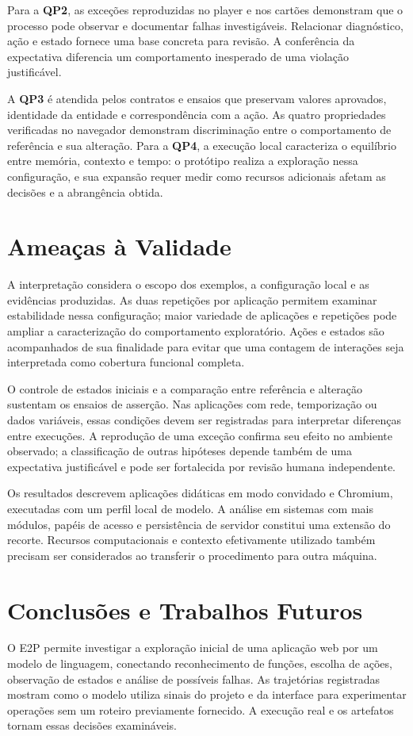 \documentclass[12pt]{article}
\begin{document}
Para a \textbf{QP2}, as exceções reproduzidas no player e nos cartões demonstram que o processo pode observar e documentar falhas investigáveis. Relacionar diagnóstico, ação e estado fornece uma base concreta para revisão. A conferência da expectativa diferencia um comportamento inesperado de uma violação justificável.

A \textbf{QP3} é atendida pelos contratos e ensaios que preservam valores aprovados, identidade da entidade e correspondência com a ação. As quatro propriedades verificadas no navegador demonstram discriminação entre o comportamento de referência e sua alteração. Para a \textbf{QP4}, a execução local caracteriza o equilíbrio entre memória, contexto e tempo: o protótipo realiza a exploração nessa configuração, e sua expansão requer medir como recursos adicionais afetam as decisões e a abrangência obtida.


\section{Ameaças à Validade}\label{sec:threats}
A interpretação considera o escopo dos exemplos, a configuração local e as evidências produzidas. As duas repetições por aplicação permitem examinar estabilidade nessa configuração; maior variedade de aplicações e repetições pode ampliar a caracterização do comportamento exploratório. Ações e estados são acompanhados de sua finalidade para evitar que uma contagem de interações seja interpretada como cobertura funcional completa.

O controle de estados iniciais e a comparação entre referência e alteração sustentam os ensaios de asserção. Nas aplicações com rede, temporização ou dados variáveis, essas condições devem ser registradas para interpretar diferenças entre execuções. A reprodução de uma exceção confirma seu efeito no ambiente observado; a classificação de outras hipóteses depende também de uma expectativa justificável e pode ser fortalecida por revisão humana independente.

Os resultados descrevem aplicações didáticas em modo convidado e Chromium, executadas com um perfil local de modelo. A análise em sistemas com mais módulos, papéis de acesso e persistência de servidor constitui uma extensão do recorte. Recursos computacionais e contexto efetivamente utilizado também precisam ser considerados ao transferir o procedimento para outra máquina.

\section{Conclusões e Trabalhos Futuros}\label{sec:conclusion}
O E2P permite investigar a exploração inicial de uma aplicação web por um modelo de linguagem, conectando reconhecimento de funções, escolha de ações, observação de estados e análise de possíveis falhas. As trajetórias registradas mostram como o modelo utiliza sinais do projeto e da interface para experimentar operações sem um roteiro previamente fornecido. A execução real e os artefatos tornam essas decisões examináveis.
\end{document}
